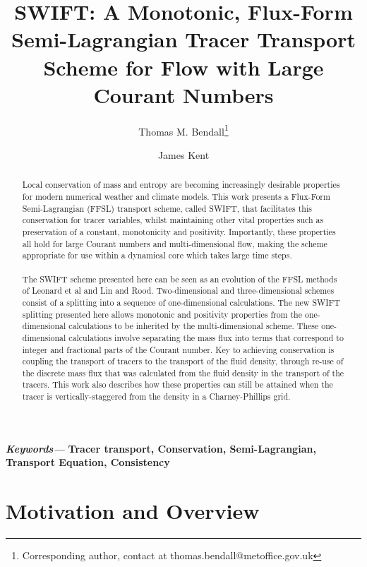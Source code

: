\documentclass[11pt,a4paper]{article}
\title{SWIFT: A Monotonic, Flux-Form Semi-Lagrangian Tracer Transport Scheme for Flow with Large Courant Numbers}
\author[1]{Thomas M. Bendall\thanks{Corresponding author, contact at thomas.bendall@metoffice.gov.uk}}
\author[1]{James Kent}
\affil[1]{Dynamics Research, Met Office, Exeter, UK}
\date{}
\providecommand{\keywords}[1]
{
  \small	
  \textbf{\textit{Keywords---}} #1
}
\begin{document}
\maketitle

\begin{abstract}
\noindent
Local conservation of mass and entropy are becoming increasingly desirable properties for modern numerical weather and climate models.
This work presents a Flux-Form Semi-Lagrangian (FFSL) transport scheme, called SWIFT, that facilitates this conservation for tracer variables, whilst maintaining other vital properties such as preservation of a constant, monotonicity and positivity.
Importantly, these properties all hold for large Courant numbers and multi-dimensional flow, making the scheme appropriate for use within a dynamical core which takes large time steps. \\
\\
The SWIFT scheme presented here can be seen as an evolution of the FFSL methods of Leonard et al and Lin and Rood.
Two-dimensional and three-dimensional schemes consist of a splitting into a sequence of one-dimensional calculations.
The new SWIFT splitting presented here allows monotonic and positivity properties from the one-dimensional calculations to be inherited by the multi-dimensional scheme.
These one-dimensional calculations involve separating the mass flux into terms that correspond to integer and fractional parts of the Courant number.
Key to achieving conservation is coupling the transport of tracers to the transport of the fluid density, through re-use of the discrete mass flux that was calculated from the fluid density in the transport of the tracers.
This work also describes how these properties can still be attained when the tracer is vertically-staggered from the density in a Charney-Phillips grid.


\end{abstract}
\keywords{\textbf{Tracer transport, Conservation, Semi-Lagrangian, Transport Equation, Consistency}}

\section{Motivation and Overview} \label{sec:intro}
\end{document}

